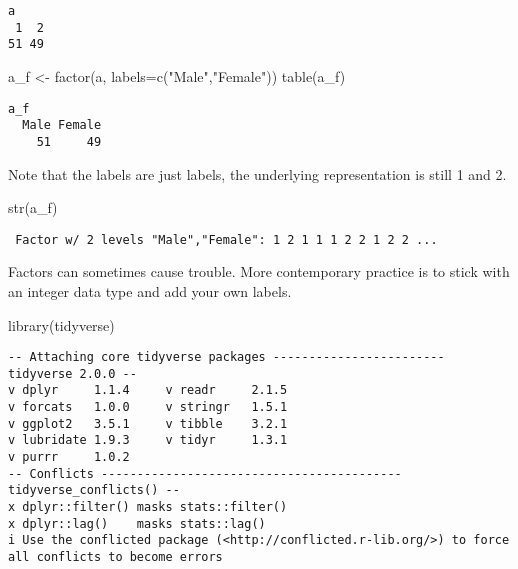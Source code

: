 \documentclass[
  letterpaper,
  DIV=11,
  numbers=noendperiod]{scrreprt}
\newenvironment{Shaded}{\begin{snugshade}}{\end{snugshade}}
\newcommand{\AttributeTok}[1]{\textcolor[rgb]{0.40,0.45,0.13}{#1}}
\newcommand{\FunctionTok}[1]{\textcolor[rgb]{0.28,0.35,0.67}{#1}}
\newcommand{\NormalTok}[1]{\textcolor[rgb]{0.00,0.23,0.31}{#1}}
\newcommand{\OtherTok}[1]{\textcolor[rgb]{0.00,0.23,0.31}{#1}}
\newcommand{\StringTok}[1]{\textcolor[rgb]{0.13,0.47,0.30}{#1}}
\begin{document}
\begin{verbatim}
a
 1  2 
51 49 
\end{verbatim}

\begin{Shaded}
\begin{Highlighting}[]
\NormalTok{a\_f }\OtherTok{\textless{}{-}} \FunctionTok{factor}\NormalTok{(a, }\AttributeTok{labels=}\FunctionTok{c}\NormalTok{(}\StringTok{"Male"}\NormalTok{,}\StringTok{"Female"}\NormalTok{))}
\FunctionTok{table}\NormalTok{(a\_f)}
\end{Highlighting}
\end{Shaded}

\begin{verbatim}
a_f
  Male Female 
    51     49 
\end{verbatim}

Note that the labels are just labels, the underlying representation is
still 1 and 2.

\begin{Shaded}
\begin{Highlighting}[]
\FunctionTok{str}\NormalTok{(a\_f)}
\end{Highlighting}
\end{Shaded}

\begin{verbatim}
 Factor w/ 2 levels "Male","Female": 1 2 1 1 1 2 2 1 2 2 ...
\end{verbatim}

Factors can sometimes cause trouble. More contemporary practice is to
stick with an integer data type and add your own labels.

\begin{Shaded}
\begin{Highlighting}[]
\FunctionTok{library}\NormalTok{(tidyverse)}
\end{Highlighting}
\end{Shaded}

\begin{verbatim}
-- Attaching core tidyverse packages ------------------------ tidyverse 2.0.0 --
v dplyr     1.1.4     v readr     2.1.5
v forcats   1.0.0     v stringr   1.5.1
v ggplot2   3.5.1     v tibble    3.2.1
v lubridate 1.9.3     v tidyr     1.3.1
v purrr     1.0.2     
-- Conflicts ------------------------------------------ tidyverse_conflicts() --
x dplyr::filter() masks stats::filter()
x dplyr::lag()    masks stats::lag()
i Use the conflicted package (<http://conflicted.r-lib.org/>) to force all conflicts to become errors
\end{verbatim}
\end{document}
